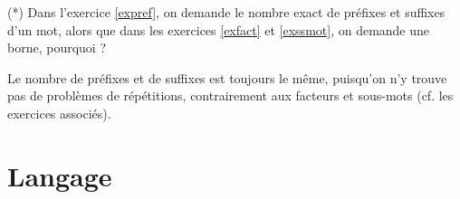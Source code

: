 \begin{exercice} (*) Dans l'exercice \ref{expref}, on demande le nombre exact de préfixes et suffixes d'un mot, alors que dans les exercices \ref{exfact} et \ref{exssmot}, on demande une borne, pourquoi ?
\end{exercice}

\begin{correction*}
Le nombre de préfixes et de suffixes est toujours le même, puisqu'on n'y trouve pas de problèmes de répétitions, contrairement aux facteurs et sous-mots (cf. les exercices associés).
\end{correction*}


\section{Langage}

